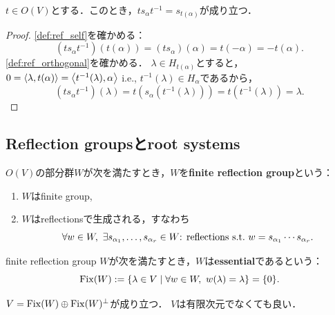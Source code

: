 \begin{lemma} \label{lem:orth_ref_orthinv}
  \label{lem:ref_inner_hold2}
  $t \in O(V)$とする．このとき，$t s_\alpha t^{-1} = s_{t(\alpha)}$が成り立つ．
\end{lemma}

\begin{proof}
  \ref{def:ref_self}を確かめる：
  \begin{equation}
    (t s_\alpha t^{-1})(t(\alpha))
    = (t s_\alpha)(\alpha)
    = t(-\alpha)
    = -t(\alpha).
  \end{equation}
  \ref{def:ref_orthogonal}を確かめる．
  $\lambda \in H_{t(\alpha)}$とすると，$0 = \left\langle \lambda, t(\alpha) \right\rangle = \left\langle t^{-1}(\lambda), \alpha \right\rangle$ i.e., $t^{-1}(\lambda) \in H_\alpha$であるから，
  \begin{equation}
    (t s_\alpha t^{-1})(\lambda)
    = t (s_\alpha(t^{-1}(\lambda)))
    = t(t^{-1}(\lambda))
    = \lambda.
  \end{equation}
\end{proof}

\subsection{Reflection groupsとroot systems}
\begin{definition}
  $O(V)$の部分群$W$が次を満たすとき，$W$を\textbf{finite reflection group}という：
  \begin{enumerate}[label=(\roman*)]
    \item $W$はfinite group,
    \item $W$はreflectionsで生成される，すなわち
    \begin{equation}
      \forall w \in W,\ \exists s_{\alpha_1}, \ldots, s_{\alpha_r} \in W \textrm{: reflections} \ \text{s.t.}\  w = s_{\alpha_1} \cdots s_{\alpha_r}.
    \end{equation}
  \end{enumerate}
\end{definition}

\begin{definition}
  finite reflection group $W$が次を満たすとき，$W$は\textbf{essential}であるという：
  \begin{equation}
    \operatorname{Fix}(W) := \left\lbrace \lambda \in V \mathrel{} \middle| \mathrel{} \forall w \in W,\ w(\lambda) = \lambda \right\rbrace = \{0\}.
  \end{equation}
\end{definition}

\begin{proposition}
  \label{prop:fix_direct_sum}
  $V = \operatorname{Fix}(W) \oplus \operatorname{Fix}(W)^\perp$が成り立つ．
  $V$は有限次元でなくても良い．
\end{proposition}

